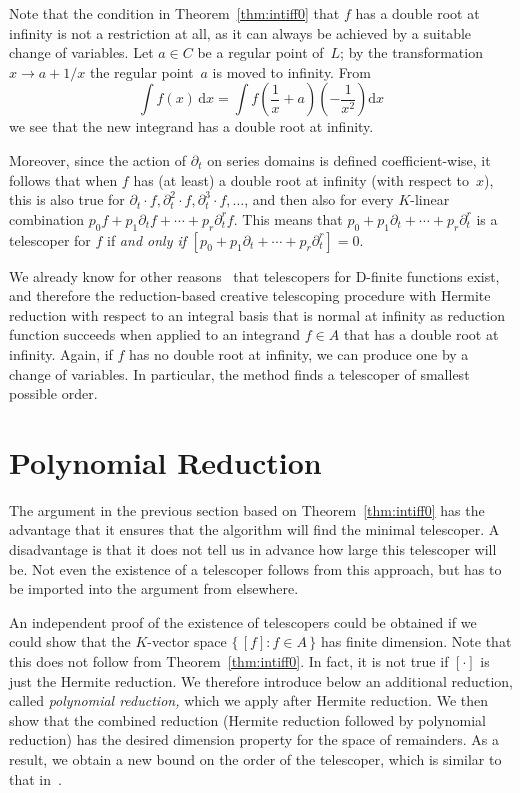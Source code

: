 \documentclass{sig-alternate}
\begin{document}
Note that the condition in Theorem~\ref{thm:intiff0} that $f$ has a double
root at infinity is not a restriction at all, as it can always be achieved by
a suitable change of variables. Let $a\in C$ be a regular point of~$L$; by
the transformation $x\to a+1/x$ the regular point~$a$ is moved to
infinity. From
\[
  \int f(x) \,\mathrm{d}x = \int f\left(\frac{1}{x}+a\right)\left(-\frac{1}{x^2}\right) \mathrm{d}x
\]
we see that the new integrand has a double root at infinity.

Moreover, since the action of $\partial_t$ on series domains is defined coefficient-wise,
it follows that when $f$ has (at least) a double root at infinity (with respect to~$x$),
this is also true for $\partial_t\cdot f, \partial_t^2\cdot f, \partial_t^3\cdot f,\dots$,
and then also for every $K$-linear combination $p_0f+p_1\partial_tf+\cdots+p_r\partial_t^rf$.
This means that $p_0+p_1\partial_t+\cdots+p_r\partial_t^r$ is a telescoper for $f$ if
\emph{and only if} $[p_0+p_1\partial_t+\cdots+p_r\partial_t^r]=0$.

We already know for other reasons~\cite{Zeilberger1990,chyzak00} that
telescopers for D-finite functions exist, and therefore the reduction-based
creative telescoping procedure with Hermite reduction with respect to an
integral basis that is normal at infinity as reduction function succeeds when
applied to an integrand $f\in A$ that has a double root at infinity. Again, if
$f$ has no double root at infinity, we can produce one by a change of variables.
In particular, the method finds a telescoper of smallest possible order.

\section{Polynomial Reduction}\label{sec:polynomial}

The argument in the previous section based on Theorem~\ref{thm:intiff0}
has the advantage that it ensures that the algorithm will find the minimal telescoper.
A disadvantage is that it does not tell us in advance how large this telescoper will be.
Not even the existence of a telescoper follows from this approach, but has to be imported
into the argument from elsewhere.

An independent proof of the existence of telescopers could be obtained if we could show
that the $K$-vector space $\{\,[f]:f\in A\,\}$ has finite dimension. Note that this does
not follow from Theorem~\ref{thm:intiff0}. In fact, it is not true if $[\cdot]$ is just
the Hermite reduction. We therefore introduce below an additional reduction, called
\emph{polynomial reduction,} which we apply after Hermite reduction. We then show that
the combined reduction (Hermite reduction followed by polynomial reduction) has the
desired dimension property for the space of remainders. As a result, we obtain a new
bound on the order of the telescoper, which is similar to that in~\cite{chen14a}.
\end{document}
